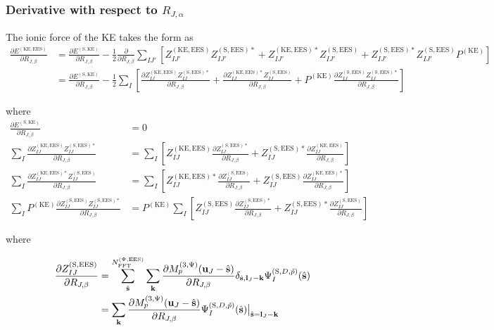 \documentclass[paper=a4, fontsize=11pt]{article} %
\numberwithin{equation}{section} %
\numberwithin{figure}{section} %
\numberwithin{table}{section} %
\newcommand{\p}{\partial}
\newcommand{\bu}{{\bf{u}}}
\newcommand{\bl}{{\bf{l}}}
\newcommand{\bk}{{\bf{k}}}
\newcommand{\bs}{{\bf{s}}}
\newcommand{\hs}{{\hat{\bf{s}}}}
\newcommand{\rS}{{\mathrm{S}}}
\newcommand{\rKE}{{\mathrm{KE}}}
\newcommand{\rEES}{{\mathrm{EES}}}
\newcommand{\RJa}{{R_{J,\alpha}}}
\newcommand{\RJb}{{R_{J,\beta}}}
\newcommand{\NFFTpEES}{{N^{\mathrm{(\Psi,\rEES})}_{\mathrm{FFT}}}}
\newcommand{\Mp}{{M_p^{(3,\Psi)}}}
\begin{document}
\subsubsection{Derivative with respect to $\RJa$}
The ionic force of the KE takes the form as \\
\begin{equation}
\begin{split}
\frac{\p E^{(\rKE,\rEES)}}{\p \RJb} &= \frac{\p E^{(\rS,\rKE)}}{\p \RJb} - \frac{1}{2}\frac{\p }{\p \RJb}\sum_{IJ'}\left[Z_{IJ'}^{(\rKE,\rEES)}Z_{IJ'}^{(\rS,\rEES)*} + Z_{IJ'}^{(\rKE,\rEES)*}Z_{IJ'}^{(\rS,\rEES)} +  Z_{IJ'}^{(\rS,\rEES)*}Z_{IJ'}^{(\rS,\rEES)}P^{(\rKE)}\right] \\
&= \frac{\p E^{(\rS,\rKE)}}{ \p \RJb} -\frac{1}{2} \sum_{I}\left[\frac{\p Z_{IJ}^{(\rKE,\rEES)}Z_{IJ}^{(\rS,\rEES)*}}{ \p \RJb} + \frac{\p Z_{IJ}^{(\rKE,\rEES)*}Z_{IJ}^{(\rS,\rEES)}}{ \p \RJb} +  P^{(\rKE)}\frac{\p Z_{IJ}^{(\rS,\rEES)}Z_{IJ}^{(\rS,\rEES)*}}{ \p \RJb}\right]
\end{split}
\end{equation}

where
\begin{equation}
\begin{split}
\frac{\p E^{(\rS,\rKE)}}{ \p \RJb} 
&= 0 \\
\sum_{I}\frac{\p Z_{IJ}^{(\rKE,\rEES)}Z_{IJ}^{(\rS,\rEES)*}}{ \p \RJb}
&= \sum_I \left[Z_{IJ}^{(\rKE,\rEES)}\frac{\p Z_{IJ}^{(\rS,\rEES)*}}{ \p \RJb} + Z_{IJ}^{(\rS,\rEES)*}\frac{\p Z_{IJ}^{(\rKE,\rEES)}}{ \p \RJb}\right] \\
\sum_{I}\frac{\p Z_{IJ}^{(\rKE,\rEES)*}Z_{IJ}^{(\rS,\rEES)}}{ \p \RJb}
&= \sum_I \left[Z_{IJ}^{(\rKE,\rEES)*}\frac{\p Z_{IJ}^{(\rS,\rEES)}}{ \p \RJb} + Z_{IJ}^{(\rS,\rEES)}\frac{\p Z_{IJ}^{(\rKE,\rEES)*}}{ \p \RJb} \right]\\
\sum_{I} P^{(\rKE)}\frac{\p Z_{IJ}^{(\rS,\rEES)}Z_{IJ}^{(\rS,\rEES)*}}{ \p \RJb}
&= P^{(\rKE)} \sum_I \left[Z_{IJ}^{(\rS,\rEES)}\frac{\p Z_{IJ}^{(\rS,\rEES)*}}{ \p \RJb} + Z_{IJ}^{(\rS,\rEES)*}\frac{\p Z_{IJ}^{(\rS,\rEES)}}{ \p \RJb} \right]
\end{split}
\end{equation}

where

\begin{equation}\label{eq:dZdR}
\begin{split}
\frac{\p Z_{IJ}^{(\rS,\rEES)}}{\p \RJb}
&= \sum_{\hat \bs}^{\NFFTpEES}  \sum_{\bk} \frac{\p \Mp(\bu_{J}-\hat \bs)}{\p \RJb}\delta_{\hat \bs,\bl_J-\bk} \Psi_I^{(\rS,D,\tilde p)}(\hs) \\
&= \sum_{\bk} \frac{\p \Mp(\bu_{J}-\hat \bs)}{\p \RJb}\Psi_I^{(\rS,D,\tilde p)}(\hs)\big|_{\hat \bs=\bl_J-\bk} \\
\end{split}
\end{equation}
\end{document}
